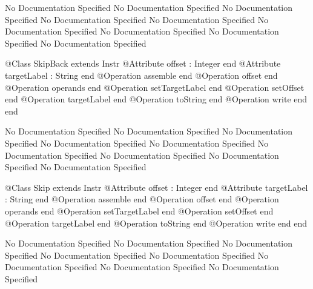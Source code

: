 No Documentation Specified
No Documentation Specified
No Documentation Specified
No Documentation Specified
No Documentation Specified
No Documentation Specified
No Documentation Specified
No Documentation Specified
No Documentation Specified
\begin{Interface}
@Class SkipBack extends Instr
  @Attribute offset : Integer end
  @Attribute targetLabel : String end
  @Operation assemble end
  @Operation offset end
  @Operation operands end
  @Operation setTargetLabel end
  @Operation setOffset end
  @Operation targetLabel end
  @Operation toString end
  @Operation write end
end
\end{Interface}
No Documentation Specified
No Documentation Specified
No Documentation Specified
No Documentation Specified
No Documentation Specified
No Documentation Specified
No Documentation Specified
No Documentation Specified
No Documentation Specified
\begin{Interface}
@Class Skip extends Instr
  @Attribute offset : Integer end
  @Attribute targetLabel : String end
  @Operation assemble end
  @Operation offset end
  @Operation operands end
  @Operation setTargetLabel end
  @Operation setOffset end
  @Operation targetLabel end
  @Operation toString end
  @Operation write end
end
\end{Interface}
No Documentation Specified
No Documentation Specified
No Documentation Specified
No Documentation Specified
No Documentation Specified
No Documentation Specified
No Documentation Specified
No Documentation Specified

